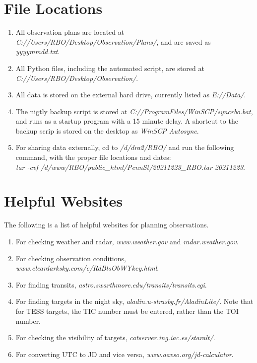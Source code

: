 \documentclass[letterpaper,12pt]{article}
\begin{document}
\section{File Locations}\label{app:files}
\begin{enumerate}
\item All observation plans are located at \textit{C://Users/RBO/Desktop/Observation/Plans/}, and are saved as \textit{yyyymmdd.txt}.
\item All Python files, including the automated script, are stored at\\ \textit{C://Users/RBO/Desktop/Observation/}.
\item All data is stored on the external hard drive, currently listed as \textit{E://Data/}.
\item The nigtly backup script is stored at \textit{C://ProgramFiles/WinSCP/syncrbo.bat}, and runs as a startup program with a 15 minute delay. A shortcut to the backup scrip is stored on the desktop as \textit{WinSCP Autosync}.
\item For sharing data externally, cd to \textit{/d/dra2/RBO/} and run the following command, with the proper file locations and dates:\\ \textit{tar -cvf /d/www/RBO/public\_html/PennSt/20211223\_RBO.tar 20211223}.
\end{enumerate}

\section{Helpful Websites}\label{app:web}
The following is a list of helpful websites for planning observations.
\begin{enumerate}
\item For checking weather and radar, \textit{www.weather.gov} and \textit{radar.weather.gov}.
\item For checking observation conditions, \textit{www.cleardarksky.com/c/RdBtsObWYkey.html}.
\item For finding transits, \textit{astro.swarthmore.edu/transits/transits.cgi}.
\item For finding targets in the night sky, \textit{aladin.u-strasbg.fr/AladinLite/}. Note that for TESS targets, the TIC number must be entered, rather than the TOI number.
\item For checking the visibility of targets, \textit{catserver.ing.iac.es/staralt/}.
\item For converting UTC to JD and vice versa, \textit{www.aavso.org/jd-calculator}.
\end{enumerate}
\end{document}
